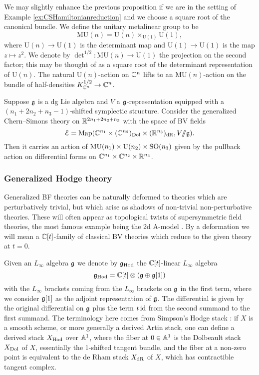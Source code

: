 \documentclass[10pt, oneside]{article}
\newcommand{\Hod}{\mathrm{Hod}}
\newcommand{\MU}{\mathrm{MU}}
\renewcommand{\U}{\mathrm{U}}
\newcommand{\ham}{/\!\!/}
\begin{document}
We may slightly enhance the previous proposition if we are in the setting of Example \ref{ex:CSHamiltonianreduction} and we choose a square root of the canonical bundle. We define the unitary metalinear group to be
\[\MU(n) = \U(n)\times_{\U(1)} \U(1),\]
where $\U(n)\rightarrow \U(1)$ is the determinant map and $\U(1)\rightarrow \U(1)$ is the map $z\mapsto z^2$. We denote by $\det^{1/2}\colon \MU(n)\rightarrow \U(1)$ the projection on the second factor; this may be thought of as a square root of the determinant representation of $\U(n)$. The natural $\U(n)$-action on $\mathbb C^n$ lifts to an $\MU(n)$-action on the bundle of half-densities $K_{\mathbb C^n}^{1/2}\rightarrow \mathbb C^n$.

\begin{prop}
Suppose $\mathfrak g$ is a dg Lie algebra and $V$ a $\mathfrak g$-representation equipped with a $(n_1+2n_2+n_3-1)$-shifted symplectic structure. Consider the generalized Chern--Simons theory on $\mathbb R^{2n_1+2n_2+n_3}$ with the space of BV fields
\[\cE = \map(\CC^{n_1}\times (\CC^{n_2})_{\mr{Dol}}\times (\RR^{n_3})_{\mr{dR}}, V\ham\fg).\]
Then it carries an action of $\MU(n_1)\times \U(n_2)\times \SO(n_3)$ given by the pullback action on differential forms on $\mathbb C^{n_1}\times \mathbb C^{n_2}\times \mathbb R^{n_3}$.
\end{prop}

\subsubsection{Generalized Hodge theory}
Generalized BF theories can be naturally deformed to theories which are perturbatively trivial, but which arise as shadows of non-trivial non-perturbative theories.  These will often appear as topological twists of supersymmetric field theories, the most famous example being the 2d A-model . By a deformation we will mean a $\mathbb C[t]$-family of classical BV theories which reduce to the given theory at $t=0$.

Given an $L_\infty$ algebra $\mathfrak g$ we denote by $\fg_{\Hod}$ the $\mathbb C[t]$-linear $L_\infty$ algebra
\[\fg_{\Hod} = \CC[t]\otimes (\fg\oplus \fg[1])\]
with the $L_\infty$ brackets coming from the $L_\infty$ brackets on $\mathfrak g$ in the first term, where we consider $\mathfrak g[1]$ as the adjoint representation of $\mathfrak g$. The differential is given by the original differential on $\mathfrak g$ plus the term $t\operatorname{id}$ from the second summand to the first summand.  The terminology here comes from Simpson's Hodge stack \cite{Simpson}: if $X$ is a smooth scheme, or more generally a derived Artin stack, one can define a derived stack $X_{\mathrm{Hod}}$ over $\mathbb{A}^1$, where the fiber at $0 \in \mathbb{A}^1$ is the Dolbeault stack $X_{\mathrm{Dol}}$ of $X$, essentially the 1-shifted tangent bundle, and the fiber at a non-zero point is equivalent to the de Rham stack $X_{\mathrm{dR}}$ of $X$, which has contractible tangent complex.
\end{document}
